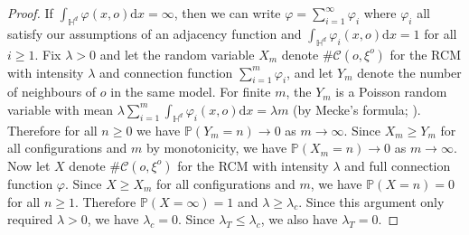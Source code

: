 \documentclass[10pt,a4paper,dvipsnames]{article}
\theoremstyle{definition}
\theoremstyle{remark}
\newcommand{\p}{\mathbb P}
\newcommand{\HypDim}{{\mathbb{H}^d}}
\newcommand{\dd}{\mathrm{d}} %
\newcommand{\C}{\mathscr {C}}
\newcommand{\orig}{o}
\newcommand{\connf}{\varphi}
\numberwithin{equation}{section}
\begin{document}
\begin{proof}
    If $\int_{\HypDim}\connf\left(x,\orig\right)\dd x =\infty$, then we can write $\connf=\sum^\infty_{i=1}\connf_i$ where $\connf_i$ all satisfy our assumptions of an adjacency function and $\int_{\HypDim}\connf_i\left(x,\orig\right)\dd x =1$ for all $i\geq 1$. Fix $\lambda>0$ and let the random variable $X_m$ denote $\#\C\left(\orig,\xi^\orig\right)$ for the RCM with intensity $\lambda$ and connection function $\sum^m_{i=1}\connf_i$, and let $Y_m$ denote the number of neighbours of $\orig$ in the same model. For finite $m$, the $Y_m$ is a Poisson random variable with mean $\lambda\sum^m_{i=1}\int_\HypDim\connf_i(x,\orig)\dd x = \lambda m$ (by Mecke's formula; \cite[(6.12)]{LasZie17}). Therefore for all $n\geq 0$ we have $\p\left(Y_m = n\right)\to 0$ as $m\to\infty$. Since $X_m\geq Y_m$ for all configurations and $m$ by monotonicity, we have $\p\left(X_m = n\right)\to 0$ as $m\to\infty$. Now let $X$ denote $\#\C\left(\orig,\xi^\orig\right)$ for the RCM with intensity $\lambda$ and full connection function $\connf$. Since $X\geq X_m$ for all configurations and $m$, we have $\p\left(X=n\right)=0$ for all $n\geq 1$. Therefore $\p\left(X=\infty\right)=1$ and $\lambda\geq \lambda_c$. Since this argument only required $\lambda>0$, we have $\lambda_c=0$. Since $\lambda_T\leq \lambda_c$, we also have $\lambda_T=0$.


\end{proof}
\end{document}
